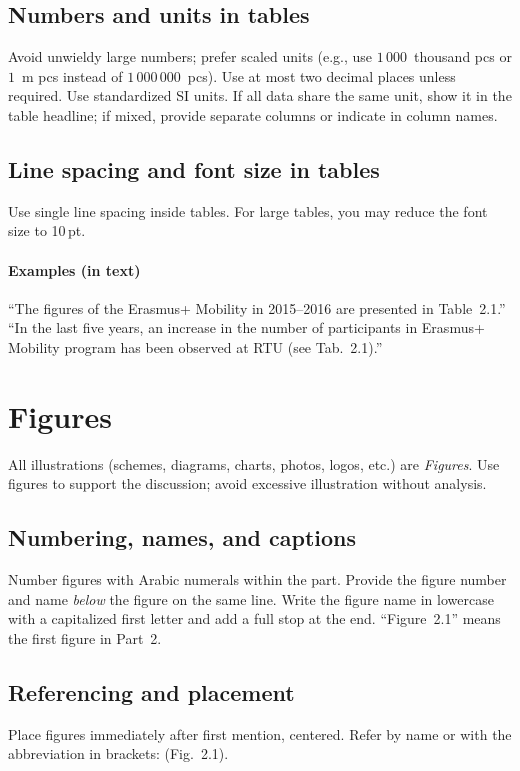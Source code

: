 \subsection*{Numbers and units in tables}
Avoid unwieldy large numbers; prefer scaled units (e.g., use $1\,000$~thousand pcs or $1$~m pcs instead of $1\,000\,000$~pcs). Use at most two decimal places unless required. Use standardized SI units. If all data share the same unit, show it in the table headline; if mixed, provide separate columns or indicate in column names.

\subsection*{Line spacing and font size in tables}
Use single line spacing inside tables. For large tables, you may reduce the font size to 10\,pt.

\paragraph*{Examples (in text)}
``The figures of the Erasmus{+} Mobility in 2015--2016 are presented in Table~2.1.'' \\
``In the last five years, an increase in the number of participants in Erasmus{+} Mobility program has been observed at RTU (see Tab.~2.1).''

\section{Figures}

All illustrations (schemes, diagrams, charts, photos, logos, etc.) are \emph{Figures}. Use figures to support the discussion; avoid excessive illustration without analysis.

\subsection*{Numbering, names, and captions}
Number figures with Arabic numerals within the part. Provide the figure number and name \emph{below} the figure on the same line. Write the figure name in lowercase with a capitalized first letter and add a full stop at the end. ``Figure~2.1'' means the first figure in Part~2.

\subsection*{Referencing and placement}
Place figures immediately after first mention, centered. Refer by name or with the abbreviation in brackets: (Fig.~2.1).

